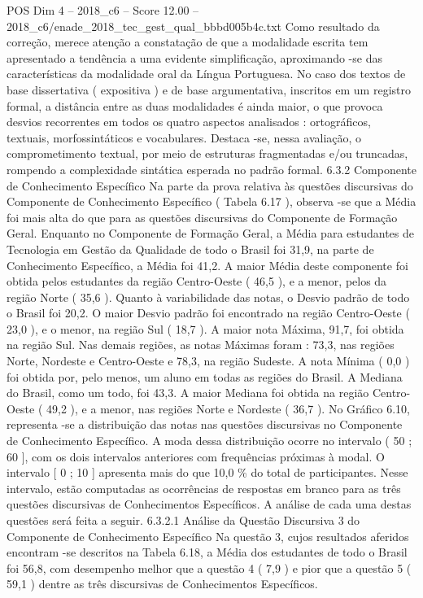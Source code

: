 \begin{textsample}{POS Dim 4 – 2018\_c6 – Score 12.00 – 2018\_c6/enade\_2018\_tec\_gest\_qual\_bbbd005b4c.txt}
Como resultado da correção, merece atenção a constatação de que a modalidade escrita tem apresentado a tendência a uma evidente simplificação, aproximando -se das características da modalidade oral da Língua Portuguesa.
No caso dos textos de base dissertativa ( expositiva ) e de base argumentativa, inscritos em um registro formal, a distância entre as duas modalidades é ainda maior, o que provoca desvios recorrentes em todos os quatro aspectos analisados : ortográficos, textuais, morfossintáticos e vocabulares.
Destaca -se, nessa avaliação, o comprometimento textual, por meio de estruturas fragmentadas e/ou truncadas, rompendo a complexidade sintática esperada no padrão formal. 6.3.2 Componente de Conhecimento Específico Na parte da prova relativa às questões discursivas do Componente de Conhecimento Específico ( Tabela 6.17 ), observa -se que a Média foi mais alta do que para as questões discursivas do Componente de Formação Geral.
Enquanto no Componente de Formação Geral, a Média para estudantes de Tecnologia em Gestão da Qualidade de todo o Brasil foi 31,9, na parte de Conhecimento Específico, a Média foi 41,2.
A maior Média deste componente foi obtida pelos estudantes da região Centro-Oeste ( 46,5 ), e a menor, pelos da região Norte ( 35,6 ).
Quanto à variabilidade das notas, o Desvio padrão de todo o Brasil foi 20,2.
O maior Desvio padrão foi encontrado na região Centro-Oeste ( 23,0 ), e o menor, na região Sul ( 18,7 ).
A maior nota Máxima, 91,7, foi obtida na região Sul.
Nas demais regiões, as notas Máximas foram : 73,3, nas regiões Norte, Nordeste e Centro-Oeste e 78,3, na região Sudeste.
A nota Mínima ( 0,0 ) foi obtida por, pelo menos, um aluno em todas as regiões do Brasil.
A Mediana do Brasil, como um todo, foi 43,3.
A maior Mediana foi obtida na região Centro-Oeste ( 49,2 ), e a menor, nas regiões Norte e Nordeste ( 36,7 ).
No Gráfico 6.10, representa -se a distribuição das notas nas questões discursivas no Componente de Conhecimento Específico.
A moda dessa distribuição ocorre no intervalo ( 50 ; 60 ], com os dois intervalos anteriores com frequências próximas à modal.
O intervalo [ 0 ; 10 ] apresenta mais do que 10,0 \% do total de participantes.
Nesse intervalo, estão computadas as ocorrências de respostas em branco para as três questões discursivas de Conhecimentos Específicos.
A análise de cada uma destas questões será feita a seguir. 6.3.2.1 Análise da Questão Discursiva 3 do Componente de Conhecimento Específico Na questão 3, cujos resultados aferidos encontram -se descritos na Tabela 6.18, a Média dos estudantes de todo o Brasil foi 56,8, com desempenho melhor que a questão 4 ( 7,9 ) e pior que a questão 5 ( 59,1 ) dentre as três discursivas de Conhecimentos Específicos.

\end{textsample}
